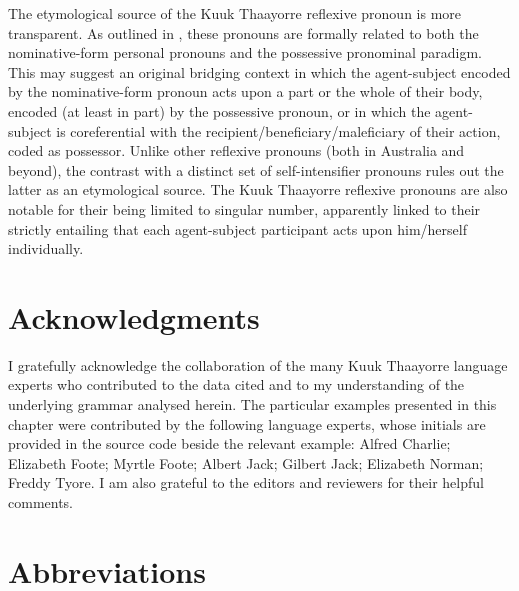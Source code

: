 \documentclass[output=paper]{langscibook}
\begin{document}
The etymological source of the Kuuk Thaayorre reflexive pronoun is more transparent. As outlined in , these pronouns are formally related to both the nominative-form personal pronouns and the possessive pronominal paradigm. This may suggest an original bridging context in which the agent-subject encoded by the nominative-form pronoun acts upon a part or the whole of their body, encoded (at least in part) by the possessive pronoun, or in which the agent-subject is coreferential with the recipient/beneficiary/maleficiary of their action, coded as possessor. Unlike other reflexive pronouns (both in Australia and beyond), the contrast with a distinct set of self-intensifier pronouns rules out the latter as an etymological source. The Kuuk Thaayorre reflexive pronouns are also notable for their being limited to singular number, apparently linked to their strictly entailing that each agent-subject participant acts upon him/herself individually.

\section{Acknowledgments}

I gratefully acknowledge the collaboration of the many Kuuk Thaayorre language experts who contributed to the data cited and to my understanding of the underlying grammar analysed herein. The particular examples presented in this chapter were contributed by the following language experts, whose initials are provided in the source code beside the relevant example: Alfred Charlie; Elizabeth Foote; Myrtle Foote; Albert Jack; Gilbert Jack; Elizabeth Norman; Freddy Tyore. I am also grateful to the editors and reviewers for their helpful comments. 

\section*{Abbreviations}
\end{document}
